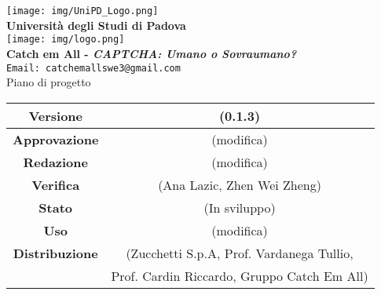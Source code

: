 \thispagestyle{empty}
\begin{titlepage}
\begin{center}
	\texttt{[image: img/UniPD\_Logo.png]}\\
	\bigskip
	\large \textbf{Università degli Studi di Padova}\\

	\texttt{[image: img/logo.png]}\\
	\bigskip
	\large \textbf{Catch em All - \textit{CAPTCHA: Umano o Sovraumano?}}\\
	\texttt{Email: catchemallswe3@gmail.com}\\
	\vfill
	{\fontsize{1.5cm}{0}\selectfont Piano di progetto}\\
	\vfill
	\begin{tabularx}{\textwidth}{|c|c|}
		\hline
		\textbf{Versione} & (0.1.3)\\
		\hline
		\textbf{Approvazione} & (modifica)\\
		\hline
		\textbf{Redazione} & (modifica)\\
		\hline
		\textbf{Verifica} & (Ana Lazic, Zhen Wei Zheng)\\
		\hline
		\textbf{Stato} & (In sviluppo)\\
		\hline
		\textbf{Uso} & (modifica)\\
		\hline
		\textbf{Distribuzione} & (Zucchetti S.p.A, Prof. Vardanega Tullio, \\
		&  Prof. Cardin Riccardo, Gruppo Catch Em All)\\
		\hline
	\end{tabularx}
\end{center}
\end{titlepage}
